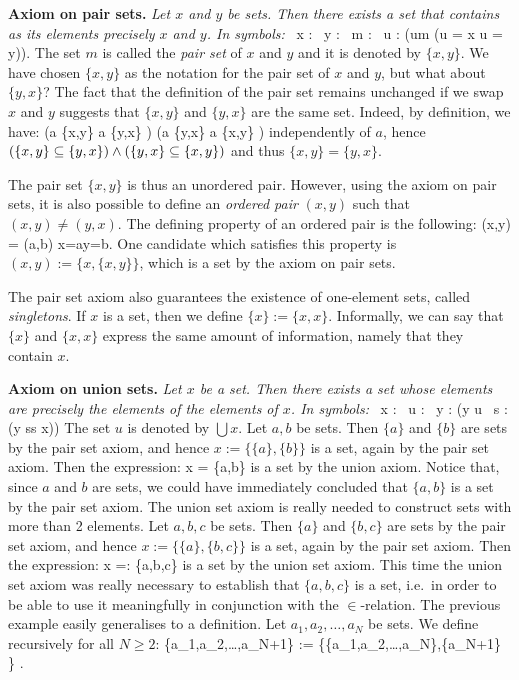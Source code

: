 \textbf{Axiom on pair sets.}
\emph{Let $x$ and $y$ be sets. Then there exists a set that contains as its
elements precisely $x$ and $y$. In symbols:}
\bse
\forall \, x : \forall \, y : \exists \, m : \forall \, u : (u\in m \eqv (u =
x \lor u = y)).
\ese
The set $m$ is called the \emph{pair set} of $x$ and $y$ and it is denoted by
$\{x,y\}$.
\br
We have chosen $\{x,y\}$ as the notation for the pair set of $x$ and $y$, but
what about $\{y,x\}$? The fact that the definition of the pair set remains
unchanged if we swap $x$ and $y$ suggests that $\{x,y\}$ and $\{y,x\}$ are the
same set. Indeed, by definition, we have:
\bse
(a \in \{x,y\} \imp a \in \{y,x\} ) \land (a \in \{y,x\} \imp a \in \{x,y\} ) 
\ese
independently of $a$, hence $(\{x,y\} \subseteq \{y,x\}) \land (\{y,x\} \subseteq
\{x,y\})$ and thus $\{x,y\} = \{y,x\}$.
\er

The pair set $\{x,y\}$ is thus an unordered pair. However, using the axiom on
pair sets, it is also possible to define an \emph{ordered pair} $(x,y)$ such
that $(x,y)\neq(y,x)$. The defining property of an ordered pair is the
following:
\bse
(x,y) = (a,b) \eqv x=a\land y=b.
\ese
One candidate which satisfies this property is $(x,y):=\{x,\{x,y\}\}$, which
is a set by the axiom on pair sets.

\br
The pair set axiom also guarantees the existence of one-element sets, called
\emph{singletons}. If $x$ is a set, then we define
$\{x\}:=\{x,x\}$. Informally, we can say that $\{x\}$ and $\{x,x\}$ express
the same amount of information, namely that they contain $x$. 
\er

\textbf{Axiom on union sets.}
\emph{Let $x$ be a set. Then there exists a set whose elements are precisely
the elements of the elements of $x$. In symbols:}
\bse
\forall \, x : \exists \, u : \forall \, y : (y \in u \eqv \exists \, s :(y
\in s\land s \in x))
\ese
The set $u$ is denoted by $\bigcup x$.
\be
Let $a,b$ be sets. Then $\{a\}$ and $\{b\}$ are sets by the pair set axiom,
and hence $x:=\{\{a\},\{b\}\}$ is a set, again by the pair set axiom. Then the
expression:
\bse
\bigcup x = \{a,b\}
\ese
is a set by the union axiom.
\ee
Notice that, since $a$ and $b$ are sets, we could have immediately concluded
that $\{a,b\}$ is a set by the pair set axiom. The union set axiom is really
needed to construct sets with more than 2 elements.
\be
Let $a,b,c$ be sets. Then $\{a\}$ and $\{b,c\}$ are sets by the pair set
axiom, and hence $x:=\{\{a\},\{b,c\}\}$ is a set, again by the pair set axiom.
Then the expression:
\bse
\bigcup x =: \{a,b,c\}
\ese
is a set by the union set axiom. This time the union set axiom was really
necessary to establish that $\{a,b,c\}$ is a set, i.e.\ in order to be able to
use it meaningfully in conjunction with the $\in$-relation.
\ee
The previous example easily generalises to a definition.
\bd
Let $a_1,a_2,\ldots,a_N$ be sets. We define recursively for all $N\geq 2$:
\bse
\{a_1,a_2,\ldots,a_{N+1}\} := \bigcup
\left\{\{a_1,a_2,\ldots,a_{N}\},\{a_{N+1}\} \right\} .
\ese
\ed

